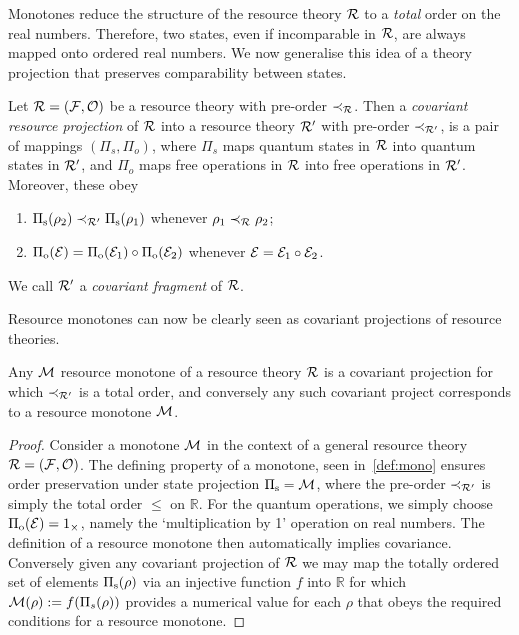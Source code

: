 \documentclass[pra,
aps,
twocolumn,
superscriptaddress,
groupedaddress,
nofootinbib,
reprint
]{revtex4-1}
\begin{document}
Monotones reduce the structure of the resource theory $\mathcal{R}$ to a \emph{total} order on the real numbers.
Therefore, two states, even if incomparable in $\mathcal{R}$, are always mapped onto ordered real numbers.
We now generalise this idea of a theory projection that preserves comparability between states. 
\begin{definition}\label{def:covproj}
Let $\mathcal{R} = (\mathcal{F}, \mathcal{O})$ be a resource theory with pre-order $\prec_{\mathcal{R}}$. 
Then a \emph{covariant resource projection} of $\mathcal{R}$ into a resource theory $\mathcal{R}'$ with pre-order $\prec_{\mathcal{R}'}$, is a pair of mappings $(\Pi_s, \Pi_o)$, where $\Pi_s$ maps quantum states in $\mathcal{R}$ into quantum states in $\mathcal{R}'$, and $\Pi_o$ maps free operations in $\mathcal{R}$ into free operations in $\mathcal{R}'$. 
Moreover, these obey
	\begin{enumerate}
        \item $\Pi_{\rm{s}}(\rho_2) \prec_{\mathcal{R}'} \Pi_{\rm{s}}(\rho_1)$ whenever $\rho_1 \prec_{\mathcal{R}} \rho_2$;
        \item $\Pi_{\rm{o}}(\mathcal{E}) = \Pi_{\rm{o}}(\mathcal{E}_1) \circ \Pi_{\rm{o}}(\mathcal{E}_2)$ whenever $\mathcal{E} = \mathcal{E}_1 \circ \mathcal{E}_2$.
    \end{enumerate}
We call $\mathcal{R}'$ a \emph{covariant fragment} of $\mathcal{R}$.
\end{definition}

Resource monotones can now be clearly seen as covariant projections of resource theories.
\begin{proposition}\label{thm:monoproj}
	Any $\mathcal{M}$ resource monotone of a resource theory $\mathcal{R}$ is a covariant projection for which $\prec_{\mathcal{R}'}$ is a total order, and conversely any such covariant project corresponds to a resource monotone $\mathcal{M}$. 
\end{proposition}
\begin{proof}
	Consider a monotone $\mathcal{M}$ in the context of a general resource theory $\mathcal{R} = (\mathcal{F}, \mathcal{O})$.
	The defining property of a monotone, seen in~\cref{def:mono} ensures order preservation under state projection $\Pi_{\rm{s}} = \mathcal{M}$, where the pre-order $\prec_{\mathcal{R}'}$ is simply the total order $\leq$ on $\mathbb{R}$. For the quantum operations, we simply choose $\Pi_{\rm{o}}(\mathcal{E}) = 1_\times$, namely the `multiplication by 1' operation on real numbers. The definition of a resource monotone then automatically implies covariance. Conversely given any covariant projection of $\mathcal{R}$ we may map the totally ordered set of elements $\Pi_{\rm{s}}(\rho)$ via an injective function $f$ into $\mathbb{R}$ for which $\mathcal{M}(\rho):=f(\Pi_s(\rho))$ provides a numerical value for each $\rho$ that obeys the required conditions for a resource monotone. 
	
\end{proof}
\end{document}
